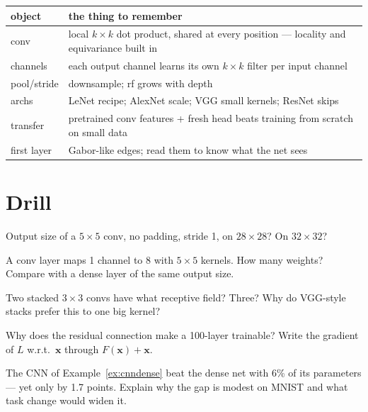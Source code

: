 \begin{center}\small
\begin{tabular}{p{}p{}}
\toprule
object & the thing to remember \\
\midrule
conv & local $k\times k$ dot product, shared at every position ---
locality and equivariance built in \\
channels & each output channel learns its own $k\times k$ filter per
input channel \\
pool/stride & downsample; rf grows with depth \\
archs & LeNet recipe; AlexNet scale; VGG small kernels; ResNet skips \\
transfer & pretrained conv features + fresh head beats training from
scratch on small data \\
first layer & Gabor-like edges; read them to know what the net sees \\
\bottomrule
\end{tabular}
\end{center}

\section*{Drill}
\begin{exercise}[{[easy]}]
Output size of a $5\times5$ conv, no padding, stride 1, on $28\times28$?
On $32\times32$?
\end{exercise}
\begin{exercise}[{[easy]}]
A conv layer maps 1 channel to 8 with $5\times5$ kernels. How many
weights? Compare with a dense layer of the same output size.
\end{exercise}
\begin{exercise}[{[medium]}]
Two stacked $3\times3$ convs have what receptive field? Three? Why do
VGG-style stacks prefer this to one big kernel?
\end{exercise}
\begin{exercise}[{[medium]}]
Why does the residual connection make a 100-layer trainable? Write
the gradient of $L$ w.r.t.\ $\mathbf x$ through $F(\mathbf x)+\mathbf x$.
\end{exercise}
\begin{exercise}[{[hard]}]
The CNN of Example~\ref{ex:cnndense} beat the dense net with 6\% of
its parameters --- yet only by 1.7 points. Explain why the gap is
modest on MNIST and what task change would widen it.
\end{exercise}

